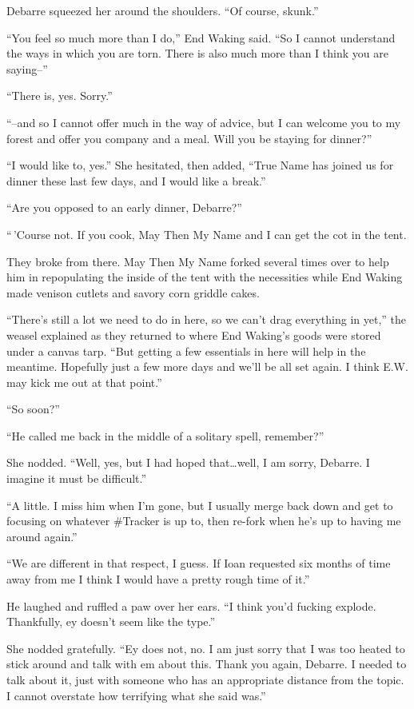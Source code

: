 Debarre squeezed her around the shoulders. ``Of course, skunk.''

``You feel so much more than I do,'' End Waking said. ``So I cannot understand the ways in which you are torn. There is also much more than I think you are saying--''

``There is, yes. Sorry.''

``--and so I cannot offer much in the way of advice, but I can welcome you to my forest and offer you company and a meal. Will you be staying for dinner?''

``I would like to, yes.'' She hesitated, then added, ``True Name has joined us for dinner these last few days, and I would like a break.''

``Are you opposed to an early dinner, Debarre?''

``\,'Course not. If you cook, May Then My Name and I can get the cot in the tent.

They broke from there. May Then My Name forked several times over to help him in repopulating the inside of the tent with the necessities while End Waking made venison cutlets and savory corn griddle cakes.

``There's still a lot we need to do in here, so we can't drag everything in yet,'' the weasel explained as they returned to where End Waking's goods were stored under a canvas tarp. ``But getting a few essentials in here will help in the meantime. Hopefully just a few more days and we'll be all set again. I think E.W. may kick me out at that point.''

``So soon?''

``He called me back in the middle of a solitary spell, remember?''

She nodded. ``Well, yes, but I had hoped that\ldots well, I am sorry, Debarre. I imagine it must be difficult.''

``A little. I miss him when I'm gone, but I usually merge back down and get to focusing on whatever \#Tracker is up to, then re-fork when he's up to having me around again.''

``We are different in that respect, I guess. If Ioan requested six months of time away from me I think I would have a pretty rough time of it.''

He laughed and ruffled a paw over her ears. ``I think you'd fucking explode. Thankfully, ey doesn't seem like the type.''

She nodded gratefully. ``Ey does not, no. I am just sorry that I was too heated to stick around and talk with em about this. Thank you again, Debarre. I needed to talk about it, just with someone who has an appropriate distance from the topic. I cannot overstate how terrifying what she said was.''

